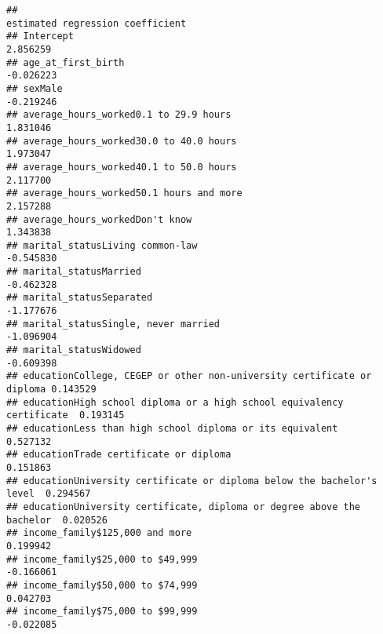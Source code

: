 \documentclass[
]{article}
\begin{document}
\begin{verbatim}
##                                                                        estimated regression coefficient
## Intercept                                                              2.856259                        
## age_at_first_birth                                                     -0.026223                       
## sexMale                                                                -0.219246                       
## average_hours_worked0.1 to 29.9 hours                                  1.831046                        
## average_hours_worked30.0 to 40.0 hours                                 1.973047                        
## average_hours_worked40.1 to 50.0 hours                                 2.117700                        
## average_hours_worked50.1 hours and more                                2.157288                        
## average_hours_workedDon't know                                         1.343838                        
## marital_statusLiving common-law                                        -0.545830                       
## marital_statusMarried                                                  -0.462328                       
## marital_statusSeparated                                                -1.177676                       
## marital_statusSingle, never married                                    -1.096904                       
## marital_statusWidowed                                                  -0.609398                       
## educationCollege, CEGEP or other non-university certificate or diploma 0.143529                        
## educationHigh school diploma or a high school equivalency certificate  0.193145                        
## educationLess than high school diploma or its equivalent               0.527132                        
## educationTrade certificate or diploma                                  0.151863                        
## educationUniversity certificate or diploma below the bachelor's level  0.294567                        
## educationUniversity certificate, diploma or degree above the bachelor  0.020526                        
## income_family$125,000 and more                                         0.199942                        
## income_family$25,000 to $49,999                                        -0.166061                       
## income_family$50,000 to $74,999                                        0.042703                        
## income_family$75,000 to $99,999                                        -0.022085                       

\end{verbatim}
\end{document}
